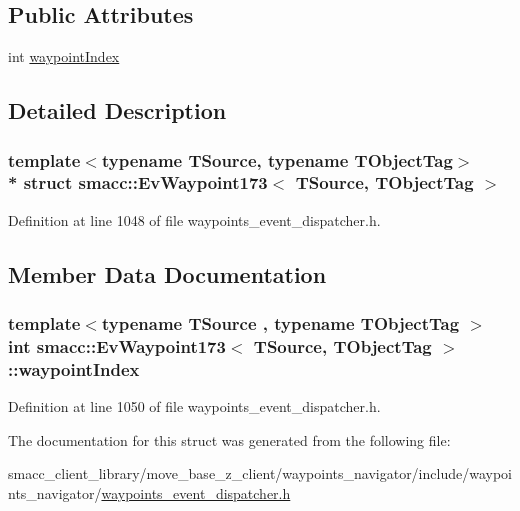 \subsection*{Public Attributes}
\begin{DoxyCompactItemize}
\item 
int \hyperlink{structsmacc_1_1EvWaypoint173_a163cadfb31a065f675035cffec0e0915}{waypoint\+Index}
\end{DoxyCompactItemize}


\subsection{Detailed Description}
\subsubsection*{template$<$typename T\+Source, typename T\+Object\+Tag$>$\\*
struct smacc\+::\+Ev\+Waypoint173$<$ T\+Source, T\+Object\+Tag $>$}



Definition at line 1048 of file waypoints\+\_\+event\+\_\+dispatcher.\+h.



\subsection{Member Data Documentation}
\subsubsection[{\texorpdfstring{waypoint\+Index}{waypointIndex}}]{\setlength{\rightskip}{0pt plus 5cm}template$<$typename T\+Source , typename T\+Object\+Tag $>$ int {\bf smacc\+::\+Ev\+Waypoint173}$<$ T\+Source, T\+Object\+Tag $>$\+::waypoint\+Index}\hypertarget{structsmacc_1_1EvWaypoint173_a163cadfb31a065f675035cffec0e0915}{}\label{structsmacc_1_1EvWaypoint173_a163cadfb31a065f675035cffec0e0915}


Definition at line 1050 of file waypoints\+\_\+event\+\_\+dispatcher.\+h.



The documentation for this struct was generated from the following file\+:\begin{DoxyCompactItemize}
\item 
smacc\+\_\+client\+\_\+library/move\+\_\+base\+\_\+z\+\_\+client/waypoints\+\_\+navigator/include/waypoints\+\_\+navigator/\hyperlink{waypoints__event__dispatcher_8h}{waypoints\+\_\+event\+\_\+dispatcher.\+h}\end{DoxyCompactItemize}
